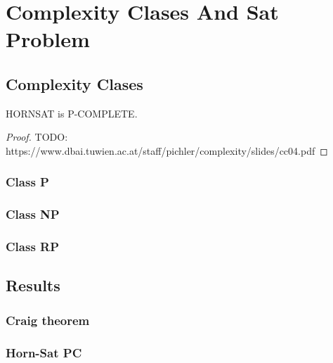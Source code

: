 
\chapter{Complexity Clases And Sat Problem} %



\section{Complexity Clases}
\begin{theorem}
  HORNSAT is P-COMPLETE.
\end{theorem}

\begin{proof}
  TODO: https://www.dbai.tuwien.ac.at/staff/pichler/complexity/slides/cc04.pdf
\end{proof}



\subsection{Class P}

\subsection{Class NP}


\subsection{Class RP}



\section{Results}

\subsection{Craig theorem}

\subsection{Horn-Sat PC}
